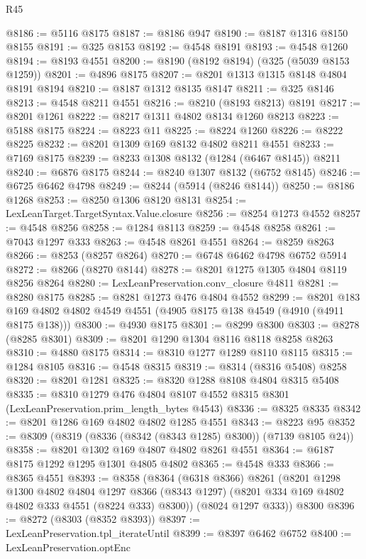 \begin{lexlean}{R45}
\begin{coremodule}
@8186 := @5116 @8175
@8187 := @8186 @947
@8190 := @8187 @1316 @8150 @8155
@8191 := @325 @8153
@8192 := @4548 @8191
@8193 := @4548 @1260
@8194 := @8193 @4551
@8200 := @8190 (@8192 @8194) (@325 (@5039 @8153 @1259))
@8201 := @4896 @8175
@8207 := @8201 @1313 @1315 @8148 @4804 @8191 @8194
@8210 := @8187 @1312 @8135 @8147
@8211 := @325 @8146
@8213 := @4548 @8211 @4551
@8216 := @8210 (@8193 @8213) @8191
@8217 := @8201 @1261
@8222 := @8217 @1311 @4802 @8134 @1260 @8213
@8223 := @5188 @8175
@8224 := @8223 @11
@8225 := @8224 @1260
@8226 := @8222 @8225
@8232 := @8201 @1309 @169 @8132 @4802 @8211 @4551
@8233 := @7169 @8175
@8239 := @8233 @1308 @8132 (@1284 (@6467 @8145)) @8211
@8240 := @6876 @8175
@8244 := @8240 @1307 @8132 (@6752 @8145)
@8246 := @6725 @6462 @4798
@8249 := @8244 (@5914 (@8246 @8144))
@8250 := @8186 @1268
@8253 := @8250 @1306 @8120 @8131
@8254 := LexLeanTarget.TargetSyntax.Value.closure
@8256 := @8254 @1273 @4552
@8257 := @4548 @8256
@8258 := @1284 @8113
@8259 := @4548 @8258
@8261 := @7043 @1297 @333
@8263 := @4548 @8261 @4551
@8264 := @8259 @8263
@8266 := @8253 (@8257 @8264)
@8270 := @6748 @6462 @4798 @6752 @5914
@8272 := @8266 (@8270 @8144)
@8278 := @8201 @1275 @1305 @4804 @8119 @8256 @8264
@8280 := LexLeanPreservation.conv_closure @4811
@8281 := @8280 @8175
@8285 := @8281 @1273 @476 @4804 @4552
@8299 := @8201 @183 @169 @4802 @4802 @4549 @4551 (@4905 @8175 @138 @4549 (@4910 (@4911 @8175 @138)))
@8300 := @4930 @8175
@8301 := @8299 @8300
@8303 := @8278 (@8285 @8301)
@8309 := @8201 @1290 @1304 @8116 @8118 @8258 @8263
@8310 := @4880 @8175
@8314 := @8310 @1277 @1289 @8110 @8115
@8315 := @1284 @8105
@8316 := @4548 @8315
@8319 := @8314 (@8316 @5408) @8258
@8320 := @8201 @1281
@8325 := @8320 @1288 @8108 @4804 @8315 @5408
@8335 := @8310
    @1279
    @476
    @4804
    @8107
    @4552
    @8315
    @8301
    (LexLeanPreservation.prim_length_bytes @4543)
@8336 := @8325 @8335
@8342 := @8201 @1286 @169 @4802 @4802 @1285 @4551
@8343 := @8223 @95
@8352 := @8309 (@8319 (@8336 (@8342 (@8343 @1285) @8300)) (@7139 @8105 @24))
@8358 := @8201 @1302 @169 @4807 @4802 @8261 @4551
@8364 := @6187 @8175 @1292 @1295 @1301 @4805 @4802
@8365 := @4548 @333
@8366 := @8365 @4551
@8393 := @8358
    (@8364
      (@6318 @8366)
      @8261
      (@8201
        @1298
        @1300
        @4802
        @4804
        @1297
        @8366
        (@8343 @1297)
        (@8201 @334 @169 @4802 @4802 @333 @4551 (@8224 @333) @8300))
      (@8024 @1297 @333))
    @8300
@8396 := @8272 (@8303 (@8352 @8393))
@8397 := LexLeanPreservation.tpl_iterateUntil
@8399 := @8397 @6462 @6752
@8400 := LexLeanPreservation.optEnc

\end{coremodule}
\end{lexlean}
